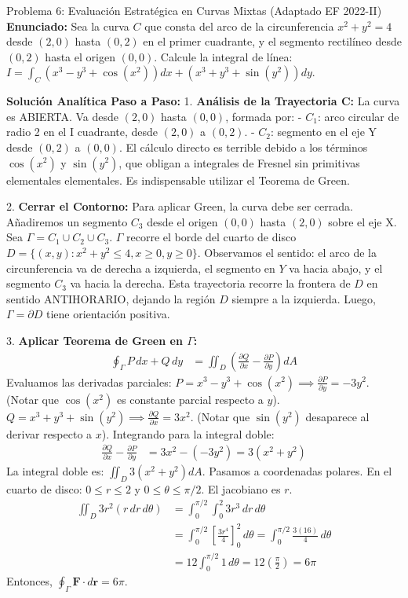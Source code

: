 \documentclass[11pt,a4paper]{article}
\begin{document}
\begin{ejerciciobox}{Problema 6: Evaluación Estratégica en Curvas Mixtas (Adaptado EF 2022-II)}
\textbf{Enunciado:}
Sea la curva $C$ que consta del arco de la circunferencia $x^2 + y^2 = 4$ desde $(2,0)$ hasta $(0,2)$ en el primer cuadrante, y el segmento rectilíneo desde $(0,2)$ hasta el origen $(0,0)$. Calcule la integral de línea:
$I = \int_C \left( x^3 - y^3 + \cos(x^2) \right) dx + \left( x^3 + y^3 + \sin(y^2) \right) dy$.

\textbf{Solución Analítica Paso a Paso:}
1. \textbf{Análisis de la Trayectoria C:}
La curva es ABIERTA. Va desde $(2,0)$ hasta $(0,0)$, formada por:
- $C_1$: arco circular de radio 2 en el I cuadrante, desde $(2,0)$ a $(0,2)$.
- $C_2$: segmento en el eje Y desde $(0,2)$ a $(0,0)$.
El cálculo directo es terrible debido a los términos $\cos(x^2)$ y $\sin(y^2)$, que obligan a integrales de Fresnel sin primitivas elementales elementales. Es indispensable utilizar el Teorema de Green.

2. \textbf{Cerrar el Contorno:}
Para aplicar Green, la curva debe ser cerrada. Añadiremos un segmento $C_3$ desde el origen $(0,0)$ hasta $(2,0)$ sobre el eje X.
Sea $\Gamma = C_1 \cup C_2 \cup C_3$.
$\Gamma$ recorre el borde del cuarto de disco $D = \{(x,y) : x^2+y^2 \le 4, x \ge 0, y \ge 0\}$.
Observamos el sentido: el arco de la circunferencia va de derecha a izquierda, el segmento en $Y$ va hacia abajo, y el segmento $C_3$ va hacia la derecha. Esta trayectoria recorre la frontera de $D$ en sentido ANTIHORARIO, dejando la región $D$ siempre a la izquierda. Luego, $\Gamma = \partial D$ tiene orientación positiva.

3. \textbf{Aplicar Teorema de Green en $\Gamma$:}
\begin{align*}
\oint_\Gamma P \, dx + Q \, dy &= \iint_D \left( \frac{\partial Q}{\partial x} - \frac{\partial P}{\partial y} \right) dA
\end{align*}
Evaluamos las derivadas parciales:
$P = x^3 - y^3 + \cos(x^2) \implies \frac{\partial P}{\partial y} = -3y^2$. (Notar que $\cos(x^2)$ es constante parcial respecto a $y$).
$Q = x^3 + y^3 + \sin(y^2) \implies \frac{\partial Q}{\partial x} = 3x^2$. (Notar que $\sin(y^2)$ desaparece al derivar respecto a $x$).
Integrando para la integral doble:
\begin{align*}
\frac{\partial Q}{\partial x} - \frac{\partial P}{\partial y} &= 3x^2 - (-3y^2) = 3(x^2 + y^2)
\end{align*}
La integral doble es:
$\iint_D 3(x^2 + y^2) dA$.
Pasamos a coordenadas polares. En el cuarto de disco: $0 \le r \le 2$ y $0 \le \theta \le \pi/2$. El jacobiano es $r$.
\begin{align*}
\iint_D 3r^2 (r \, dr \, d\theta) &= \int_0^{\pi/2} \int_0^2 3r^3 \, dr \, d\theta \\
&= \int_0^{\pi/2} \left[ \frac{3r^4}{4} \right]_0^2 \, d\theta = \int_0^{\pi/2} \frac{3(16)}{4} \, d\theta \\
&= 12 \int_0^{\pi/2} 1 \, d\theta = 12 \left( \frac{\pi}{2} \right) = 6\pi
\end{align*}
Entonces, $\oint_\Gamma \mathbf{F} \cdot d\mathbf{r} = 6\pi$.


\end{ejerciciobox}
\end{document}
